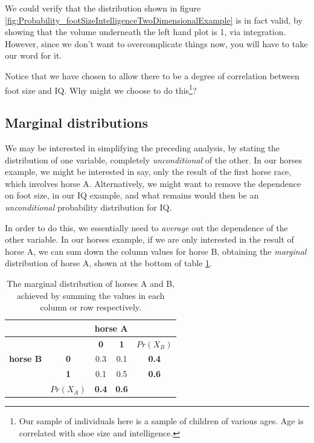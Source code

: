 \documentclass[11pt,fullpage]{book}
\begin{document}
We could verify that the distribution shown in figure \ref{fig:Probability_footSizeIntelligenceTwoDimensionalExample} is in fact valid, by showing that the volume underneath the left hand plot is 1, via integration. However, since we don't want to overcomplicate things now, you will have to take our word for it.

Notice that we have chosen to allow there to be a degree of correlation between foot size and IQ. Why might we choose to do this\footnote{Our sample of individuals here is a sample of children of various ages. Age is correlated with shoe size and intelligence.}?

\subsection{Marginal distributions}\label{sec:Probability_marginal}
We may be interested in simplifying the preceding analysis, by stating the distribution of one variable, completely \textit{unconditional} of the other. In our horses example, we might be interested in say, only the result of the first horse race, which involves horse A. Alternatively, we might want to remove the dependence on foot size, in our IQ example, and what remains would then be an \textit{unconditional} probability distribution for IQ.

In order to do this, we essentially need to \textit{average} out the dependence of the other variable. In our horses example, if we are only interested in the result of horse A, we can sum down the column values for horse B, obtaining the \textit{marginal} distribution of horse A, shown at the bottom of table \ref{tab:Probability_coinsMarginal}.


\begin{table}[htbp]
  \centering
    \begin{tabular}{rrccr}
    \toprule
          &       & \multicolumn{2}{c}{\textbf{horse A}} &  \\
    \midrule
          &       & \textbf{0} & \textbf{1} & \multicolumn{1}{c}{\textbf{$Pr(X_B)$}} \\
    \multicolumn{1}{c}{\textbf{horse B}} & \multicolumn{1}{c}{\textbf{0}} & 0.3   & 0.1   & \multicolumn{1}{c}{\textbf{0.4}} \\
    \multicolumn{1}{c}{} & \multicolumn{1}{c}{\textbf{1}} & 0.1   & 0.5   & \multicolumn{1}{c}{\textbf{0.6}} \\
          & \multicolumn{1}{c}{\textbf{$Pr(X_A)$}} & \textbf{0.4} & \textbf{0.6} & \multicolumn{1}{c}{} \\
    \bottomrule
    \end{tabular}%
  \caption{The marginal distribution of horses A and B, achieved by summing the values in each column or row respectively.}\label{tab:Probability_coinsMarginal}%
\end{table}%
\end{document}
